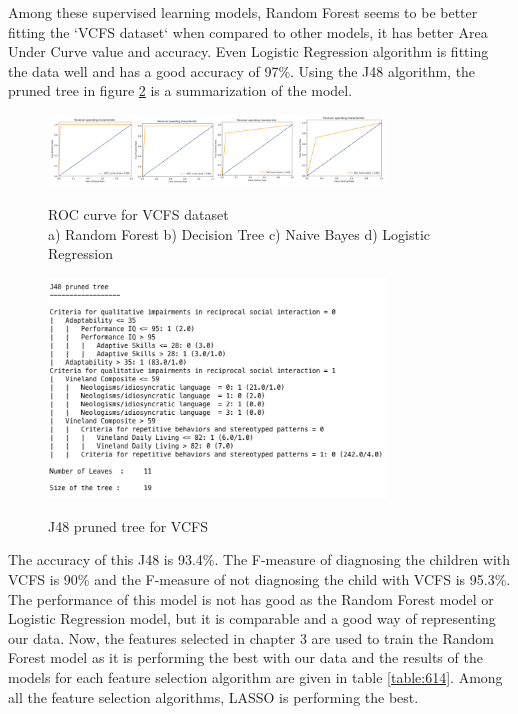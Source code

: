 Among these supervised learning models, Random Forest seems to be better fitting the `VCFS dataset` when compared to other models, it has better Area Under Curve value and accuracy. Even Logistic Regression algorithm is fitting the data well and has a good accuracy of 97\%. Using the J48 algorithm, the pruned tree in figure \ref{fig:67} is a summarization of the model.
\begin{figure}
\centering
  {\includegraphics[width=0.8\textwidth]{Figures/Figure_6_6.png}}
  \caption{ ROC curve for VCFS dataset \\ a) Random Forest b) Decision Tree c) Naive Bayes d) Logistic Regression }
  \label{fig:63}
\end{figure}
\begin{figure}
\centering
  {\includegraphics[width=0.8\textwidth]{Figures/Figure_6_7.png}}
  \caption{ J48 pruned tree for VCFS}
  \label{fig:67}
\end{figure}
The accuracy of this J48 is 93.4\%. The F-measure of diagnosing the children with VCFS is 90\% and the F-measure of not diagnosing the child with VCFS is 95.3\%. The performance of this model is not has good as the Random Forest model or Logistic Regression model, but it is comparable and a good way of representing our data. Now, the features selected in chapter 3 are used to train the Random Forest model as it is performing the best with our data and the results of the models for each feature selection algorithm are given in table \ref{table:614}. Among all the feature selection algorithms, LASSO is performing the best.
